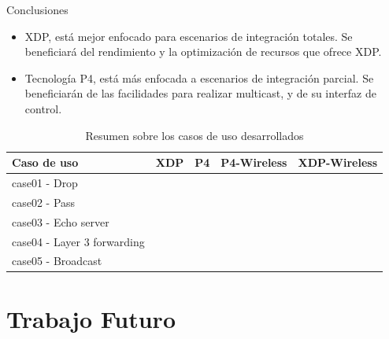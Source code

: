 \documentclass[10pt,compress,xcolor=table]{beamer} %
\newcommand{\cmark}{\ding{51}}%
\newcommand{\xmark}{\ding{55}}%
\begin{document}
\begin{frame}{Conclusiones}
\begin{itemize}
    \item  XDP, está mejor enfocado para escenarios de integración totales. Se beneficiará del rendimiento y la optimización de recursos que ofrece XDP.\vspace{0.2cm}
    
    \item Tecnología P4, está más enfocada a escenarios de integración parcial. Se beneficiarán de las facilidades para realizar multicast, y de su interfaz de control.
\end{itemize}
\vspace{0.2cm}

\begin{table}[ht]
\centering
\begin{tabular}{|l|c|c|c|c|}
\hline
\rowcolor[HTML]{0046AD} 
{\color[HTML]{FFFFFF} \textbf{Caso de uso}} &
  {\color[HTML]{FFFFFF} \textbf{XDP}} &
  {\color[HTML]{FFFFFF} \textbf{P4}} &
  {\color[HTML]{FFFFFF} \textbf{P4-Wireless}} &
  {\color[HTML]{FFFFFF} \textbf{XDP-Wireless}} \\ \hline
case01 - Drop               & \cmark         & \cmark         & \cmark         & \cmark \\ \hline
case02 - Pass               & \cmark         & \alert{\xmark} & \alert{\xmark} & \cmark \\ \hline
case03 - Echo server        & \cmark         & \cmark         & \cmark         & \cmark \\ \hline
case04 - Layer 3 forwarding & \cmark         & \cmark         & \cmark         & \cmark \\ \hline
case05 - Broadcast          & \alert{\xmark} & \cmark         & \cmark         & \cmark \\ \hline
\end{tabular}
\caption{Resumen sobre los casos de uso desarrollados}
\label{tab:useCases}
\end{table}
\end{frame}

\section{Trabajo Futuro}
\end{document}
